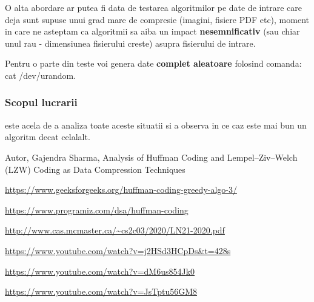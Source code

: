 \documentclass[runningheads]{llncs}
\begin{document}
O alta abordare ar putea fi data de testarea algoritmilor pe date de intrare care deja sunt
supuse unui grad mare de compresie (imagini, fisiere PDF etc), moment in care ne asteptam ca
algoritmii sa aiba un impact \textbf{nesemnificativ} (sau chiar unul rau - dimensiunea fisierului creste)
asupra fisierului de intrare.

Pentru o parte din teste voi genera date \textbf{complet aleatoare} folosind comanda:
cat /dev/urandom.

\subsubsection{Scopul lucrarii} este acela de a analiza toate aceste situatii si a observa
in ce caz este mai bun un algoritm decat celalalt.





\begin{thebibliography}{8}
Autor, Gajendra Sharma, Analysis of Huffman Coding and Lempel–Ziv–Welch (LZW) Coding as
Data Compression Techniques\textbf{}

\url{https://www.geeksforgeeks.org/huffman-coding-greedy-algo-3/}

\url{https://www.programiz.com/dsa/huffman-coding}

\url{http://www.cas.mcmaster.ca/~cs2c03/2020/LN21-2020.pdf}

\url{https://www.youtube.com/watch?v=j2HSd3HCpDs\&t=428s}

\url{https://www.youtube.com/watch?v=dM6us854Jk0}

\url{https://www.youtube.com/watch?v=JsTptu56GM8}

\end{thebibliography}
\end{document}
